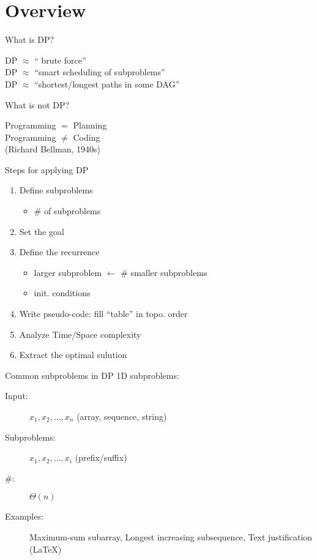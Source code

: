 \section{Overview}

\begin{frame}{What is DP?}
  \begin{center}
	DP $\approx$ `` brute force'' \\
	DP $\approx$ ``smart scheduling of subproblems'' \\
	DP $\approx$ ``shortest/longest paths in some DAG''
  \end{center}
\end{frame}
\begin{frame}{What is not DP?}
  \begin{center}
	Programming $=$ Planning \\[15pt] \pause
	Programming $\neq$ Coding \\[5pt]
	(Richard Bellman, 1940s)
  \end{center}
\end{frame}
\begin{frame}{Steps for applying DP}
  \begin{enumerate}
	\item Define subproblems
	  \begin{itemize}
		\item \# of subproblems
	  \end{itemize}
	\item Set the goal
	\item Define the recurrence
	  \begin{itemize}
		\item larger subproblem $\gets$ \# smaller subproblems
		\item init. conditions
	  \end{itemize}
	\item Write pseudo-code: fill ``table'' in topo. order
	\item Analyze Time/Space complexity
	\item Extract the optimal sulution
  \end{enumerate}
\end{frame}
\begin{frame}{Common subproblems in DP}
  1D subproblems:
  \begin{description}
	\item[Input:] $x_1, x_2, \dots, x_n$ (array, sequence, string)
	\item[Subproblems:] $x_1, x_2, \dots, x_i$ (prefix/suffix)
	\item[\#:] $\Theta(n)$
	  \pause
	\item[Examples:] Maximum-sum subarray, Longest increasing subsequence, Text justification (\LaTeX)
  \end{description}
\end{frame}
